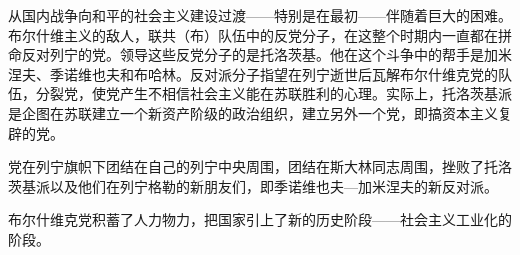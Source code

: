 从国内战争向和平的社会主义建设过渡——特别是在最初——伴随着巨大的困难。布尔什维主义的敌人，联共（布）队伍中的反党分子，在这整个时期内一直都在拼命反对列宁的党。领导这些反党分子的是托洛茨基。他在这个斗争中的帮手是加米涅夫、季诺维也夫和布哈林。反对派分子指望在列宁逝世后瓦解布尔什维克党的队伍，分裂党，使党产生不相信社会主义能在苏联胜利的心理。实际上，托洛茨基派是企图在苏联建立一个新资产阶级的政治组织，建立另外一个党，即搞资本主义复辟的党。

党在列宁旗帜下团结在自己的列宁中央周围，团结在斯大林同志周围，挫败了托洛茨基派以及他们在列宁格勒的新朋友们，即季诺维也夫—加米涅夫的新反对派。

布尔什维克党积蓄了人力物力，把国家引上了新的历史阶段——社会主义工业化的阶段。

